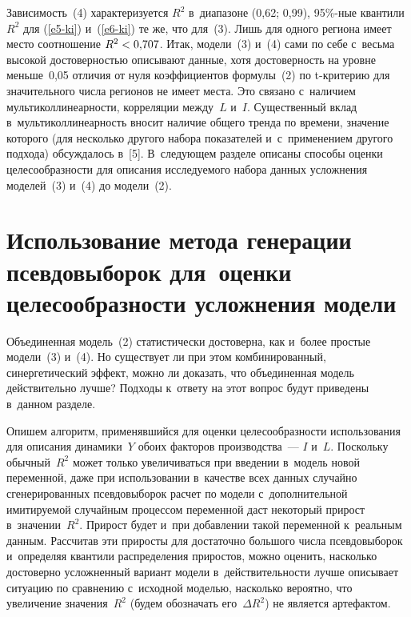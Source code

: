 \begin{multicols}{2}
{}
  
  Зависимость~(4) характеризуется $R^2$ в~диапазоне (0,62; 0,99), 
  95\%-ные квантили $R^2$ для 
(\ref{e5-ki}) и~(\ref{e6-ki}) те же, что для~(3). 
Лишь для одного региона имеет мес\-то соотношение $R^2\hm< 
0{,}707$.
  Итак, модели~(3) и~(4) сами по себе с~весьма высокой достоверностью описывают 
данные, хотя достоверность на уровне меньше~0,05 отличия от нуля коэффициентов 
формулы~(2) по t-кри\-те\-рию для значительного числа регионов не 
имеет мес\-та. Это 
связано с~наличием мультиколлинеарности, корреляции между~$L$ и~$I$. Существенный 
вклад в~мультиколлинеарность вносит наличие общего тренда по времени, значение 
которого (для несколько другого набора показателей и~с~применением другого подхода) 
обсуждалось в~[5]. В~следующем разделе описаны способы оценки целесообразности 
для описания исследуемого набора данных усложнения моделей~(3) и~(4) 
до модели~(2).
{ %

}

\section{Использование метода генерации псевдовыборок для~оценки 
целесообразности усложнения модели}

\vspace*{-13pt}

  Объединенная модель~(2) статистически достоверна, как и~более простые модели~(3) 
и~(4). Но существует ли при этом комбинированный, синергетический эффект, можно ли 
доказать, что объединенная модель действительно лучше? Подходы к~ответу на этот 
вопрос будут приведены в~данном разделе.
  
  Опишем алгоритм, применявшийся для оценки целесообразности использования для 
описания динамики~$Y$ обоих факторов производства~--- $I$ и~$L$. Поскольку 
обычный~$R^2$ может только увеличиваться при введении в~модель новой переменной, 
даже при использовании в~качестве всех данных случайно сгенерированных 
псевдовыборок расчет по модели с~дополнительной имитируемой случайным процессом 
переменной даст некоторый прирост в~значении~$R^2$. Прирост будет и~при 
добавлении такой переменной к~реальным данным. Рассчитав эти приросты для 
достаточно большого числа псевдовыборок и~определяя квантили распределения 
приростов, можно оценить, насколько достоверно усложненный вариант модели 
в~действительности лучше описывает ситуацию по сравнению с~исходной моделью, 
насколько вероятно, что увеличение значения~$R^2$ (будем обозначать его~$\Delta 
R^2$) не является артефактом.
  

\end{multicols}
